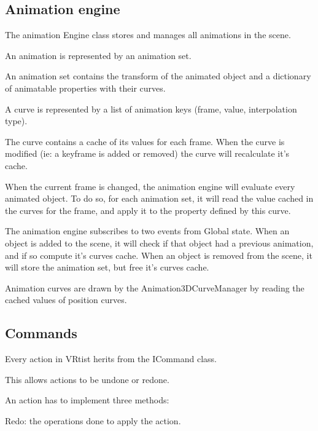 \documentclass[letterpaper,10pt,english,openany,oneside]{sphinxmanual}
\begin{document}
\subsection{Animation engine}
\label{\detokenize{ScriptReferences/Script:animation-engine}}
\begin{DUlineblock}{0em}
\item[] The animation Engine class stores and manages all animations in the scene.
\item[] 
\item[] An animation is represented by an animation set.
\item[] An animation set contains the transform of the animated object and a dictionary of animatable properties with their curves.
\item[] A curve is represented by a list of animation keys (frame, value, interpolation type).
\item[] The curve contains a cache of its values for each frame. When the curve is modified (ie: a keyframe is added or removed) the curve will recalculate it’s cache.
\item[] 
\item[] When the current frame is changed, the animation engine will evaluate every animated object. To do so, for each animation set, it will read the value cached in the curves for the frame, and apply it to the property defined by this curve.
\item[] 
\item[] The animation engine subscribes to two events from Global state. When an object is added to the scene, it will check if that object had a previous animation, and if so compute it’s curves cache. When an object is removed from the scene, it will store the animation set, but free it’s curves cache.
\item[] 
\item[] Animation curves are drawn by the Animation3DCurveManager by reading the cached values of position curves.
\item[] 
\end{DUlineblock}


\subsection{Commands}
\label{\detokenize{ScriptReferences/Script:commands}}
\begin{DUlineblock}{0em}
\item[] Every action in VRtist herits from the ICommand class.
\item[] This allows actions to be undone or redone.
\item[] 
\item[] An action has to implement three methods:
\item[] Redo: the operations done to apply the action.
\end{DUlineblock}
\end{document}
